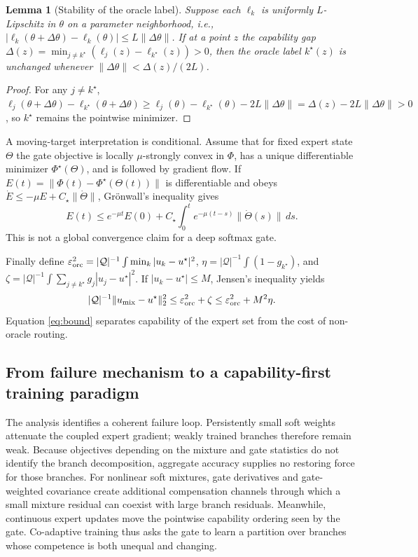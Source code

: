 \documentclass[preprint,12pt]{elsarticle}
\newtheorem{lemma}{Lemma}
\theoremstyle{remark}
\begin{document}
\begin{lemma}[Stability of the oracle label]
Suppose each $\ell_k$ is uniformly $L$-Lipschitz in $\theta$ on a parameter neighborhood, i.e.,
$|\ell_k(\theta+\Delta\theta)-\ell_k(\theta)|\le L\|\Delta\theta\|$.
If at a point $z$ the capability gap $\Delta(z)=\min_{j\ne k^\star}(\ell_j(z)-\ell_{k^\star}(z))>0$,
then the oracle label $k^\star(z)$ is unchanged whenever $\|\Delta\theta\|<\Delta(z)/(2L)$.
\end{lemma}
\begin{proof}
For any $j\ne k^\star$,
$\ell_j(\theta+\Delta\theta)-\ell_{k^\star}(\theta+\Delta\theta)
\ge \ell_j(\theta)-\ell_{k^\star}(\theta)-2L\|\Delta\theta\|
=\Delta(z)-2L\|\Delta\theta\|>0$,
so $k^\star$ remains the pointwise minimizer.
\end{proof}

A moving-target interpretation is conditional. Assume that for fixed expert state $\Theta$ the gate objective is locally $\mu$-strongly convex in $\Phi$, has a unique differentiable minimizer $\Phi^\star(\Theta)$, and is followed by gradient flow. If $E(t)=\|\Phi(t)-\Phi^\star(\Theta(t))\|$ is differentiable and obeys $\dot E\le-\mu E+C_\star\|\dot\Theta\|$, Gr\"onwall's inequality gives
\begin{equation}
E(t)\le e^{-\mu t}E(0)+C_\star\int_0^t e^{-\mu(t-s)}\|\dot\Theta(s)\|\,ds .
\end{equation}
This is not a global convergence claim for a deep softmax gate.

Finally define
$\varepsilon_{\rm orc}^2=|\mathcal Q|^{-1}\int\min_k|u_k-u^\star|^2$,
$\eta=|\mathcal Q|^{-1}\int(1-g_{k^\star})$, and
$\zeta=|\mathcal Q|^{-1}\int\sum_{j\ne k^\star}g_j|u_j-u^\star|^2$.
If $|u_k-u^\star|\le M$, Jensen's inequality yields
\begin{equation}
|\mathcal Q|^{-1}\|u_{\rm mix}-u^\star\|_2^2
\le \varepsilon_{\rm orc}^2+\zeta\le\varepsilon_{\rm orc}^2+M^2\eta .
\label{eq:bound}
\end{equation}
Equation \eqref{eq:bound} separates capability of the expert set from the cost of non-oracle routing.

\subsection{From failure mechanism to a capability-first training paradigm}
The analysis identifies a coherent failure loop. Persistently small soft weights attenuate the coupled expert gradient; weakly trained branches therefore remain weak. Because objectives depending on the mixture and gate statistics do not identify the branch decomposition, aggregate accuracy supplies no restoring force for those branches. For nonlinear soft mixtures, gate derivatives and gate-weighted covariance create additional compensation channels through which a small mixture residual can coexist with large branch residuals. Meanwhile, continuous expert updates move the pointwise capability ordering seen by the gate. Co-adaptive training thus asks the gate to learn a partition over branches whose competence is both unequal and changing.
\end{document}
